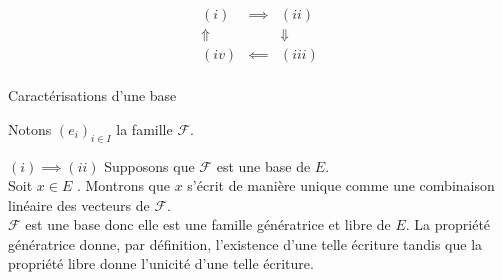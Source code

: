 \documentclass{article}
\begin{document}
\begin{question_kholle}
		\begin{equation*}
			\begin{matrix}
				(i) &\!\!\!\implies\!\!\!& (ii) \\
				\Uparrow & & \Downarrow \\
				(iv) &\!\!\!\impliedby\!\!\!& (iii) \\
			\end{matrix}
		\end{equation*}
	\end{question_kholle}

	\begin{question_kholle}
		{Caractérisations d'une base}

		Notons $(e_i)_{i \in I}$ la famille $\mathcal{F}$.


		$(i) \implies (ii)$ Supposons que $\mathcal{F}$ est une base de $E$. \\
		Soit $x \in E$ \fq. Montrons que $x$ s'écrit de manière unique comme une combinaison linéaire des vecteurs de $\mathcal{F}$. \\
		$\mathcal{F}$ est une base donc elle est une famille génératrice et libre de $E$. La propriété génératrice donne, par définition, l'existence d'une telle écriture tandis que la propriété libre donne l'unicité d'une telle écriture.


\end{question_kholle}
\end{document}
